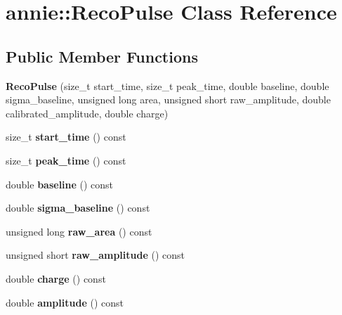 \hypertarget{classannie_1_1RecoPulse}{\section{annie\-:\-:Reco\-Pulse Class Reference}
\label{classannie_1_1RecoPulse}
}
\subsection*{Public Member Functions}
\begin{DoxyCompactItemize}
\item 
\hypertarget{classannie_1_1RecoPulse_af6919399c8fd73cdead617200b636dca}{{\bfseries Reco\-Pulse} (size\-\_\-t start\-\_\-time, size\-\_\-t peak\-\_\-time, double baseline, double sigma\-\_\-baseline, unsigned long area, unsigned short raw\-\_\-amplitude, double calibrated\-\_\-amplitude, double charge)}\label{classannie_1_1RecoPulse_af6919399c8fd73cdead617200b636dca}

\item 
\hypertarget{classannie_1_1RecoPulse_afc6daae53d2755764f5e6c7153e78dc5}{size\-\_\-t {\bfseries start\-\_\-time} () const }\label{classannie_1_1RecoPulse_afc6daae53d2755764f5e6c7153e78dc5}

\item 
\hypertarget{classannie_1_1RecoPulse_ab95885be21ccb875482754c57e8ee9e0}{size\-\_\-t {\bfseries peak\-\_\-time} () const }\label{classannie_1_1RecoPulse_ab95885be21ccb875482754c57e8ee9e0}

\item 
\hypertarget{classannie_1_1RecoPulse_a5ba9f0b4bfb1bde8ff4dd099a1c22f24}{double {\bfseries baseline} () const }\label{classannie_1_1RecoPulse_a5ba9f0b4bfb1bde8ff4dd099a1c22f24}

\item 
\hypertarget{classannie_1_1RecoPulse_a3ea1063181e0996788aa55490df24ea5}{double {\bfseries sigma\-\_\-baseline} () const }\label{classannie_1_1RecoPulse_a3ea1063181e0996788aa55490df24ea5}

\item 
\hypertarget{classannie_1_1RecoPulse_a0b0097734ca3854c64f3742466a0a512}{unsigned long {\bfseries raw\-\_\-area} () const }\label{classannie_1_1RecoPulse_a0b0097734ca3854c64f3742466a0a512}

\item 
\hypertarget{classannie_1_1RecoPulse_a8968a30e4ebb46514d496a79175258e0}{unsigned short {\bfseries raw\-\_\-amplitude} () const }\label{classannie_1_1RecoPulse_a8968a30e4ebb46514d496a79175258e0}

\item 
\hypertarget{classannie_1_1RecoPulse_ae1ae2094a38f52cc05f0e542a461e27b}{double {\bfseries charge} () const }\label{classannie_1_1RecoPulse_ae1ae2094a38f52cc05f0e542a461e27b}

\item 
\hypertarget{classannie_1_1RecoPulse_ac5cff941c570f064d18db3bdf0877714}{double {\bfseries amplitude} () const }\label{classannie_1_1RecoPulse_ac5cff941c570f064d18db3bdf0877714}

\end{DoxyCompactItemize}
